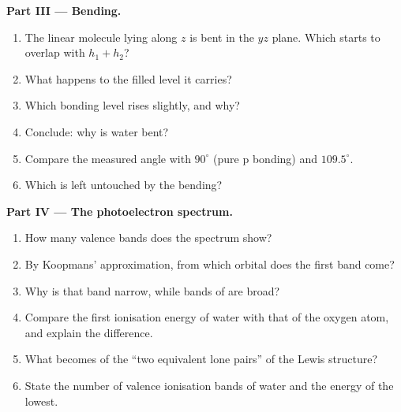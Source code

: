 \begin{problem}
\medskip
\noindent\textbf{Part III --- Bending.}
\begin{enumerate}[resume]
  \item The linear molecule lying along $z$ is bent in the $yz$ plane. Which
         starts to overlap with $h_1 + h_2$?
  \item What happens to the filled level it carries?
  \item Which bonding level rises slightly, and why?
  \item Conclude: why is water bent?
  \item Compare the measured angle with $90^\circ$ (pure p bonding) and $109.5^\circ$.
  \item Which  is left untouched by the bending?
\end{enumerate}

\medskip
\noindent\textbf{Part IV --- The photoelectron spectrum.}
\begin{enumerate}[resume]
  \item How many valence bands does the spectrum show?
  \item By Koopmans' approximation, from which orbital does the first band come?
  \item Why is that band narrow, while bands of  are broad?
  \item Compare the first ionisation energy of water with that of the oxygen
        atom, and explain the difference.
  \item What becomes of the ``two equivalent lone pairs'' of the Lewis structure?
  \item State the number of valence ionisation bands of water and the energy of
        the lowest.
\end{enumerate}
\end{problem}
